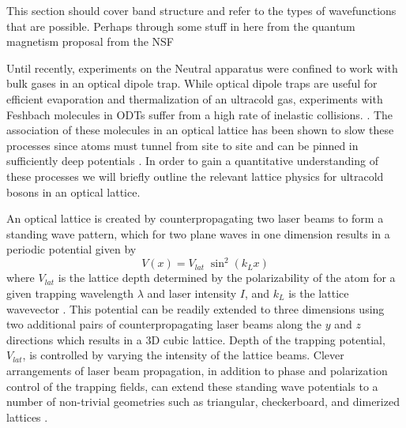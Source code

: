 This section should cover band structure and refer to the types of wavefunctions that are possible. Perhaps through some stuff in here from the quantum magnetism proposal from the NSF 

Until recently, experiments on the Neutral apparatus were confined to work with bulk gases in an optical dipole trap. While optical dipole traps are useful for efficient evaporation and thermalization of an ultracold gas, experiments with Feshbach molecules in ODTs suffer from a high rate of inelastic collisions. \cite{Kohler2006}. The association of these molecules in an optical lattice has been shown to slow these processes since atoms must tunnel from site to site and can be pinned in sufficiently deep potentials \cite{Thalhammer2006,Syassen2007}. In order to gain a quantitative understanding of these processes we will briefly outline the relevant lattice physics for ultracold bosons in an optical lattice.

An optical lattice is created by counterpropagating two laser beams to form a standing wave pattern, which for two plane waves in one dimension results in a periodic potential given by 
	\begin{equation} \label{eq:1dlattice}
		 V(x) = V_{lat} \; \sin^2(k_L x)
	\end{equation}
where $V_{lat}$ is the lattice depth determined by the polarizability of the atom for a given trapping wavelength $\lambda$ and laser intensity $I$, and $k_L$ is the lattice wavevector . This potential can be readily extended to three dimensions using two additional pairs of counterpropagating laser beams along the $y$ and $z$ directions which results in a 3D cubic lattice. Depth of the trapping potential, $V_{lat}$, is controlled by varying the intensity of the lattice beams. Clever arrangements of laser beam propagation, in addition to phase and polarization control of the trapping fields, can extend these standing wave potentials to a number of non-trivial geometries such as triangular, checkerboard, and dimerized lattices \cite{Greiner2003}.

